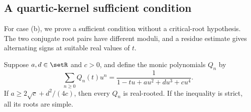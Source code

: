 \subsection[toeplitzQuarticKernel]{A quartic-kernel sufficient condition}

For case (b), we prove a sufficient condition without a critical-root
hypothesis. The two conjugate root pairs have different moduli, and a
residue estimate gives alternating signs at suitable real values of $t$.

\begin{proposition}
Suppose $a,d\in\setR$ and $c>0$, and define the monic polynomials $Q_n$ by
\[
 \sum_{n\geq0}Q_n(t)u^n=\frac1{1-tu+au^2+du^3+cu^4}.
\]
If $a\geq2\sqrt c+d^2/(4c)$, then every $Q_n$ is real-rooted.
If the inequality is strict, all its roots are simple.
\end{proposition}

